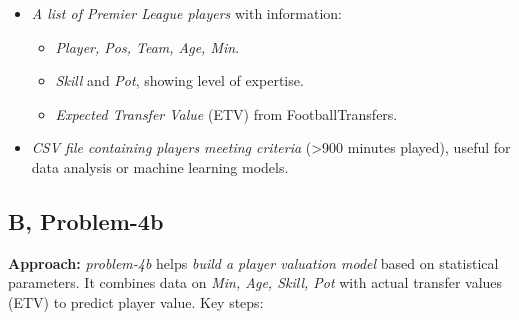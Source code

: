 \documentclass[12pt]{article}
\begin{document}
\begin{itemize}
    \item \textit{A list of Premier League players} with information:
    
    \begin{itemize}
        \item \textit{Player, Pos, Team, Age, Min}.
        \item \textit{Skill} and \textit{Pot}, showing level of expertise.
        \item \textit{Expected Transfer Value} (ETV) from FootballTransfers.
    \end{itemize}
    
    \item \textit{CSV file containing players meeting criteria} (>900 minutes played), useful for data analysis or machine learning models.
\end{itemize}

\subsection*{B, Problem-4b}

\textbf{Approach:} \textit{problem-4b} helps \textit{build a player valuation model} based on statistical parameters. It combines data on \textit{Min, Age, Skill, Pot} with actual transfer values (ETV) to predict player value.
Key steps:
\end{document}
